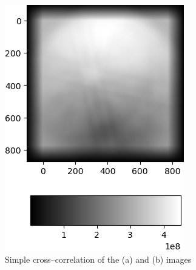 \begin{figure}
\begin{subfigure}{.49\textwidth}
		\includegraphics[width=\linewidth]{img/normalized_simple_corr}
		\caption{Simple cross--correlation of the (a) and (b) images}
		\label{normalized-simple-cross}
	\end{subfigure}
	\begin{subfigure}{.49\textwidth}
		\centering

\end{subfigure}
\end{figure}
